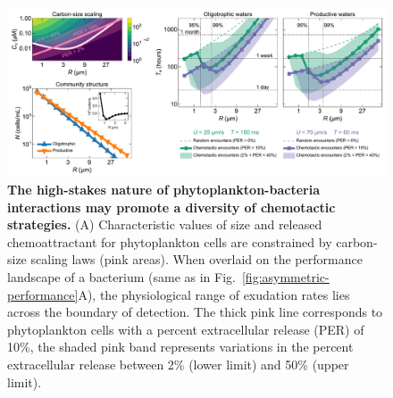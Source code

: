 \documentclass[9pt,twocolumn,twoside]{pnas-new}
\begin{document}


\begin{figure}
    \centering
    \includegraphics[width=17.8cm]{fig5_mod.pdf}
    \caption{
        \textbf{
        The high-stakes nature of phytoplankton-bacteria interactions may promote a diversity of chemotactic strategies.
        }
        (A) Characteristic values of size and released chemoattractant for phytoplankton cells are constrained by carbon-size scaling laws (pink areas). When overlaid on the performance landscape of a bacterium (same as in Fig.~\ref{fig:asymmetric-performance}A), the physiological range of exudation rates lies across the boundary of detection.
        The thick pink line corresponds to phytoplankton cells with a percent extracellular release (PER) of 10\%, the shaded pink band represents variations in the percent extracellular release between 2\% (lower limit) and 50\% (upper limit).
}
\end{figure}
\end{document}
